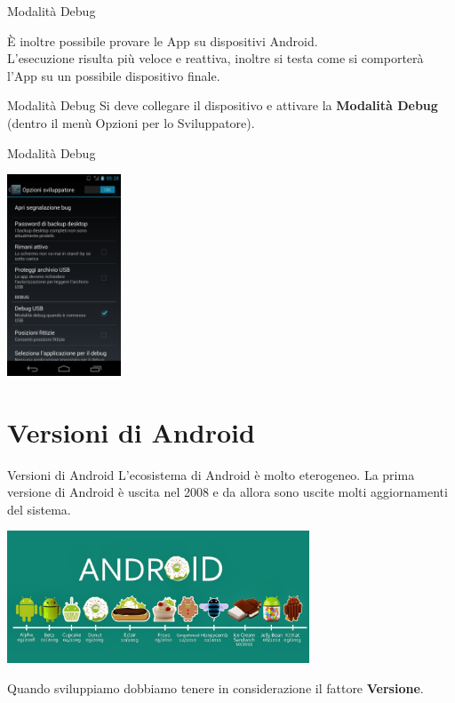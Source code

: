 \documentclass[xcolor=svgnames,11pt]{beamer}
\begin{document}
\begin{frame}{Modalit\`a Debug}

	\`E inoltre possibile provare le App su dispositivi Android.\\
	\pause
	\medskip
	L'esecuzione risulta pi\`u veloce e reattiva, inoltre si testa come si comporter\`a l'App su un possibile dispositivo finale.\\
	\pause
	\medskip
	\begin{block}{Modalit\`a Debug}
	Si deve collegare il dispositivo e attivare la \textbf{Modalit\`a Debug} (dentro il men\`u Opzioni per lo Sviluppatore).
	\end{block}	
\end{frame}


\begin{frame}{Modalit\`a Debug}
\begin{center}
\includegraphics[height=6cm]{debug.png}
\end{center}
\end{frame}

\section{Versioni di Android}

\begin{frame}{Versioni di Android}
L'ecosistema di Android \`e molto eterogeneo. La prima versione di Android \`e uscita nel 2008 e da allora sono uscite molti aggiornamenti del sistema.

\medskip

\begin{center}

\includegraphics[width=9cm]{versions.jpg}

\end{center}

\pause
\medskip

Quando sviluppiamo dobbiamo tenere in considerazione il fattore \textbf{Versione}.

\end{frame}
\end{document}
